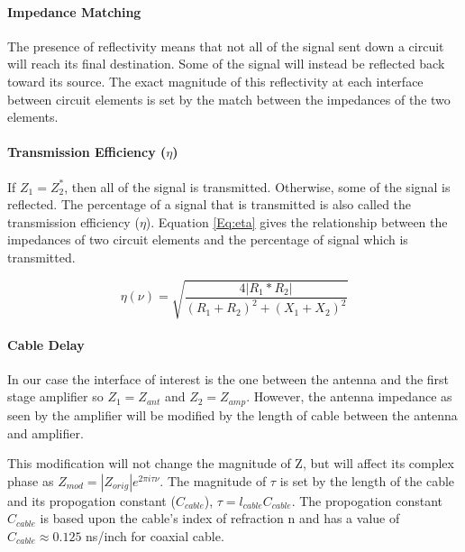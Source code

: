\paragraph{Impedance Matching}
The presence of reflectivity means that not all of the signal sent down a circuit will reach its final destination. Some of the signal will instead be reflected back toward its source. The exact magnitude of this reflectivity at each interface between circuit elements is set by the match between the impedances of the two elements. 

\paragraph{Transmission Efficiency ($\eta$)}
If $Z_1 = Z^*_2$, then all of the signal is transmitted. Otherwise, some of the signal is reflected. The percentage of a signal that is transmitted is also called the transmission efficiency ($\eta$). Equation \ref{Eq:eta} gives the relationship between the impedances of two circuit elements and the percentage of signal which is transmitted. 

\begin{equation} \label{Eq:eta}
\eta (\nu) = \sqrt{\frac{4 |R_{1}*R_{2}|}{(R_{1}+R_{2})^2+(X_{1}+X_{2})^2}}
\end{equation}

\paragraph{Cable Delay}
In our case the interface of interest is the one between the antenna and the first stage amplifier so $Z_1 = Z_{ant}$ and $Z_2 = Z_{amp}$. However, the antenna impedance as seen by the amplifier will be modified by the length of cable between the antenna and amplifier. 

This modification will not change the magnitude of Z, but will affect its complex phase as $Z_{mod} = |Z_{orig}| e^{2 \pi i \tau \nu }$. The magnitude of $\tau$ is set by the length of the cable and its propogation constant ($C_{cable}$), $\tau = l_{cable} C_{cable}$. The propogation constant $C_{cable}$ is based upon the cable's index of refraction n and has a value of $C_{cable} \approx 0.125$ ns/inch for coaxial cable. 

